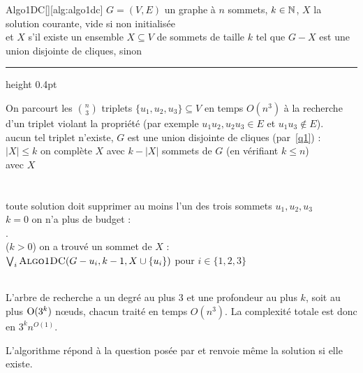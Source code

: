 \begin{td-sol}
\begin{enumerate}[label=\alph*)]
        \begin{cleanalgo}{Algo1DC}[][alg:algo1dc]
             \(G = (V, E)\) un graphe à \(n\) sommets, \(k\in\mathbb{N}\), \(X\) la solution courante, vide si non initialisée \\
              et \(X\) s'il existe un ensemble \(X \subseteq V\) de sommets de taille \(k\) tel que \(G - X\) est une union disjointe de cliques,  sinon\\[4pt]
            {\color{AlgoBorder}\hrule height 0.4pt}\vspace{6pt}
            On parcourt les \(\binom{n}{3}\) triplets \(\{u_1, u_2, u_3\} \subseteq V\) en temps \(O(n^3)\) \`a la recherche d'un triplet violant la propri\'et\'e (par exemple \(u_1 u_2, u_2 u_3 \in E\) et \(u_1 u_3 \notin E\)). \\
             aucun tel triplet n'existe,  \(G\) est une union disjointe de cliques (par~\ref{q1}) : \\
            \I {} \(|X| \leq k\)  on compl\`ete \(X\) avec \(k - |X|\) sommets de \(G\) (en v\'erifiant \(k \le n\)) \\
            \II {}  avec \(X\)\\
            \I {}\\
            \\[4pt]
             toute solution doit supprimer au moins l'un des trois sommets \(u_1, u_2, u_3\)\\
            \I {} \(k = 0\)  on n'a plus de budget :\\
            \II {} . \\
            \I {} (\(k > 0\))  on a trouvé un sommet de \(X\) :\\
            \II {} \(\bigvee_{i}\textsc{Algo1DC}(G - u_i, k - 1, X \cup \{u_i\})\) pour \(i \in \{1, 2, 3\}\)\\
            \I {} \\
        \end{cleanalgo}
        
        L'arbre de recherche a un degr\'e au plus \(3\) et une profondeur au plus \(k\), soit au plus \(\mathrm{O}(3^k)\) n\oe{}uds, chacun trait\'e en temps \(O(n^3)\). La complexit\'e totale est donc en \(3^k n^{O(1)}\).

        L'algorithme répond à la question posée par  et renvoie m\^eme la solution si elle existe.
    \end{enumerate}
\end{td-sol}

